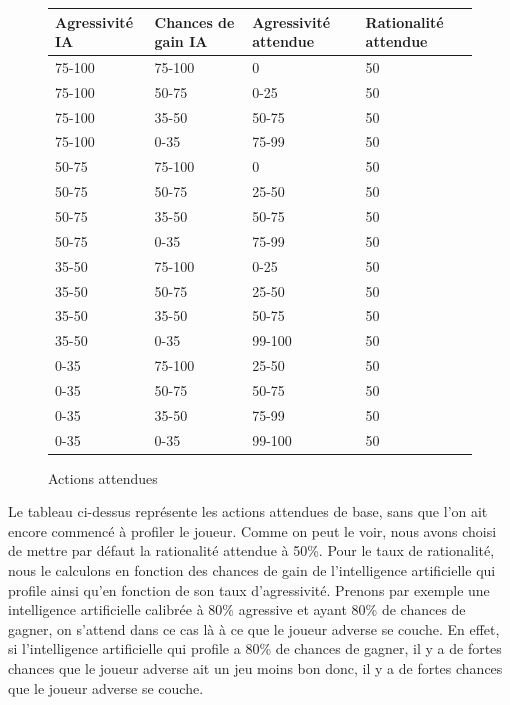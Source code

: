 \documentclass{report}
\begin{document}
\begin{figure}[H]
\begin{center}
\begin{tabular}{|l|l|l|l|}
	\hline
   Agressivité IA & Chances de gain IA & Agressivité attendue & Rationalité attendue\\
   \hline
   75-100 & 75-100 & 0 & 50\\
   \hline
   75-100 & 50-75 & 0-25 & 50\\
   \hline
   75-100 & 35-50 & 50-75 & 50\\
   \hline
   75-100 & 0-35 & 75-99 & 50\\
   \hline
   50-75 & 75-100 & 0 & 50\\
   \hline
   50-75 & 50-75 & 25-50 & 50\\
   \hline
   50-75 & 35-50 & 50-75 & 50\\
   \hline
   50-75 & 0-35 & 75-99 & 50\\
   \hline
   35-50 & 75-100 & 0-25 & 50\\
   \hline
   35-50 & 50-75 & 25-50 & 50\\
   \hline
   35-50 & 35-50 & 50-75 & 50\\
   \hline
   35-50 & 0-35 & 99-100 & 50\\
   \hline
   0-35	 & 75-100 & 25-50 & 50\\
   \hline
   0-35 & 50-75 & 50-75 & 50\\
   \hline
   0-35 & 35-50 & 75-99 & 50\\
   \hline
   0-35 & 0-35 & 99-100 & 50\\
   \hline
\end{tabular}	
\end{center}
\caption{Actions attendues}
\end{figure}

Le tableau ci-dessus représente les actions attendues de base, sans que l'on ait encore commencé à profiler le joueur. Comme on peut le voir, nous avons choisi de mettre par défaut la rationalité attendue à 50\%. Pour le taux de rationalité, nous le calculons en fonction des chances de gain de l'intelligence artificielle qui profile ainsi qu'en fonction de son taux d'agressivité. Prenons par exemple une intelligence artificielle calibrée à 80\% agressive et ayant 80\% de chances de gagner, on s'attend dans ce cas là à ce que le joueur adverse se couche. En effet, si l'intelligence artificielle qui profile a 80\% de chances de gagner, il y a de fortes chances que le joueur adverse ait un jeu moins bon donc, il y a de fortes chances que le joueur adverse se couche.\\
\end{document}
